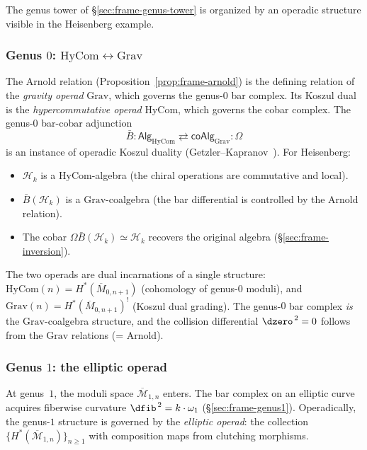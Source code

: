 The genus tower of \S\ref{sec:frame-genus-tower} is organized by an
operadic structure visible in the Heisenberg example.

\subsubsection*{Genus $0$: $\mathrm{HyCom} \leftrightarrow \mathrm{Grav}$}

The Arnold relation (Proposition~\ref{prop:frame-arnold}) is the
defining relation of the \emph{gravity operad} $\mathrm{Grav}$,
which governs the genus-$0$ bar complex. Its Koszul dual is the
\emph{hypercommutative operad} $\mathrm{HyCom}$, which governs the
cobar complex. The genus-$0$ bar-cobar adjunction
\[
\bar{B} \colon \mathsf{Alg}_{\mathrm{HyCom}}
\rightleftarrows
\mathsf{coAlg}_{\mathrm{Grav}} :\! \Omega
\]
is an instance of operadic Koszul duality (Getzler--Kapranov~\cite{GK94}).
For Heisenberg:
\begin{itemize}
\item $\mathcal{H}_k$ is a $\mathrm{HyCom}$-algebra (the chiral
 operations are commutative and local).
\item $\bar{B}(\mathcal{H}_k)$ is a $\mathrm{Grav}$-coalgebra
 (the bar differential is controlled by the Arnold relation).
\item The cobar $\Omega\bar{B}(\mathcal{H}_k) \simeq \mathcal{H}_k$
 recovers the original algebra
 (\S\ref{sec:frame-inversion}).
\end{itemize}

The two operads are dual incarnations of a single structure:
$\mathrm{HyCom}(n) = H^*(\overline{M}_{0,n+1})$ (cohomology of
genus-$0$ moduli), and $\mathrm{Grav}(n) = H^*(\overline{M}_{0,n+1})^!$
(Koszul dual grading). The genus-$0$ bar complex \emph{is} the
$\mathrm{Grav}$-coalgebra structure, and the collision differential
$\dzero^{\,2} = 0$
follows from the $\mathrm{Grav}$ relations (= Arnold).

\subsubsection*{Genus $1$: the elliptic operad}

At genus~$1$, the moduli space $\overline{\mathcal{M}}_{1,n}$
enters. The bar complex on an elliptic curve acquires fiberwise
curvature $\dfib^{\,2} = k \cdot \omega_1$
(\S\ref{sec:frame-genus1}). Operadically,
the genus-$1$ structure is governed by the \emph{elliptic operad}:
the collection $\{H^*(\overline{\mathcal{M}}_{1,n})\}_{n \geq 1}$
with composition maps from clutching morphisms.

